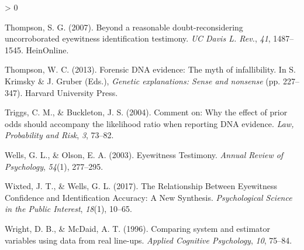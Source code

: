 \documentclass[
  10pt,
  dvipsnames,enabledeprecatedfontcommands]{scrartcl}
\newlength{\cslhangindent}
\newenvironment{CSLReferences}[2] %
 {%
  \setlength{\parindent}{0pt}
  \ifodd #1 \everypar{\setlength{\hangindent}{\cslhangindent}}\ignorespaces\fi
  \ifnum #2 > 0
  \setlength{\parskip}{#2\baselineskip}
  \fi
 }%
 {}
\begin{document}
\begin{CSLReferences}{1}{0}
\leavevmode\hypertarget{ref-thompson2007beyond}{}%
Thompson, S. G. (2007). Beyond a reasonable doubt-reconsidering
uncorroborated eyewitness identification testimony. \emph{UC Davis L.
Rev.}, \emph{41}, 1487--1545. HeinOnline.

\leavevmode\hypertarget{ref-thompson2012forensic}{}%
Thompson, W. C. (2013). Forensic DNA evidence: The myth of
infallibility. In S. Krimsky \& J. Gruber (Eds.), \emph{Genetic
explanations: Sense and nonsense} (pp. 227--347). Harvard University
Press.

\leavevmode\hypertarget{ref-triggsCommentWhyEffect}{}%
Triggs, C. M., \& Buckleton, J. S. (2004). Comment on: {Why} the effect
of prior odds should accompany the likelihood ratio when reporting {DNA}
evidence. \emph{Law, Probability and Risk}, \emph{3}, 73--82.

\leavevmode\hypertarget{ref-wells2003EyewitnessTestimony}{}%
Wells, G. L., \& Olson, E. A. (2003). Eyewitness {Testimony}.
\emph{Annual Review of Psychology}, \emph{54}(1), 277--295.

\leavevmode\hypertarget{ref-wixted2017RelationshipEyewitnessConfidence}{}%
Wixted, J. T., \& Wells, G. L. (2017). The {Relationship Between
Eyewitness Confidence} and {Identification Accuracy}: {A New Synthesis}.
\emph{Psychological Science in the Public Interest}, \emph{18}(1),
10--65.

\leavevmode\hypertarget{ref-Wright1996ComparingSystemEstimator}{}%
Wright, D. B., \& McDaid, A. T. (1996). Comparing system and estimator
variables using data from real line-ups. \emph{Applied Cognitive
Psychology}, \emph{10}, 75--84.

\end{CSLReferences}
\end{document}
